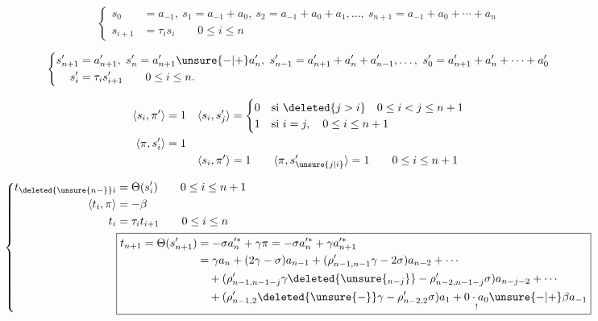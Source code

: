 \[
\left\{\begin{aligned}
s_0&=a_{-1},\ s_1=a_{-1}+a_0,\ s_2=a_{-1}+a_0+a_1,\ldots,\ s_{n+1}=a_{-1}+a_0+\cdots+a_n\\
s_{i+1}&=\tau_i s_i\qquad0\le i\le n
\end{aligned}\right.
\]

\[
\left\{\begin{aligned}
s'_{n+1}&=a'_{n+1},\ s'_n=a'_{n+1}\unsure{-|+}a'_n,\ s'_{n-1}=a'_{n+1}+a'_n+a'_{n-1},\ldots,\ s'_0=a'_{n+1}+a'_n+\cdots+a'_0\\
s'_i&=\tau_i s'_{i+1}\qquad0\le i\le n.
\end{aligned}\right.
\]

\[
\begin{aligned}
\langle s_i,\pi'\rangle&=1&\langle s_i,s'_j\rangle&=\begin{cases}0&\text{si }\deleted{j>i}\quad0\le i<j\le n+1\\1&\text{si }i=j,\quad0\le i\le n+1\end{cases}\\
\langle\pi,s'_i\rangle&=1\\
&&\langle s_i,\pi'\rangle&=1\qquad\langle\pi,s'_{\unsure{j|i}}\rangle=1\qquad0\le i\le n+1
\end{aligned}
\]


\[
\left\{\begin{aligned}
t_{\deleted{\unsure{n-}}i}&=\Theta(s'_i)\qquad0\le i\le n+1\\
\langle t_i,\pi\rangle&=-\beta\\
t_i&=\tau_i t_{i+1}\qquad0\le i\le n\\
&\boxed{\begin{aligned}
t_{n+1}=\Theta(s'_{n+1})&=-\sigma a_n^{\prime *}+\gamma\pi=-\sigma a_n^{\prime *}+\gamma a_{n+1}^{\prime *}\\
&=\gamma a_n+(2\gamma-\sigma)a_{n-1}+(\rho'_{n-1,n-1}\gamma-2\sigma)a_{n-2}+\cdots\\
&\quad+(\rho'_{n-1,n-1-j}\gamma\deleted{\unsure{_{n-j}}}-\rho'_{n-2,n-1-j}\sigma)a_{n-j-2}+\cdots\\
&\quad+(\rho'_{n-1,2}\deleted{\unsure{-}}\gamma-\rho'_{n-2,2}\sigma)a_1+\underset{!}{0\cdot a_0}\unsure{-|+}\beta a_{-1}
\end{aligned}}
\end{aligned}\right.
\]

